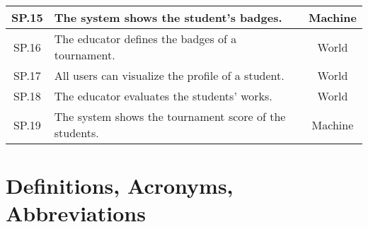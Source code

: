 \begin{table}[H]
{\begin{tabular}{|c|l|c|}
    SP.15 \label{SP.15}&  The system shows the student's badges. & Machine  \\ \hline
    SP.16 \label{SP.16}&  The educator defines the badges of a tournament. & World  \\ \hline
    SP.17 \label{SP.17}&  All users can visualize the profile of a student. & World  \\ \hline
    SP.18 \label{SP.18}&  The educator evaluates the students' works. & World  \\ \hline
    SP.19 \label{SP.19}&  The system shows the tournament score of the students. & Machine  \\ \hline
    \end{tabular}
    }
    \end{table}
    \clearpage

\section{Definitions, Acronyms, Abbreviations}
